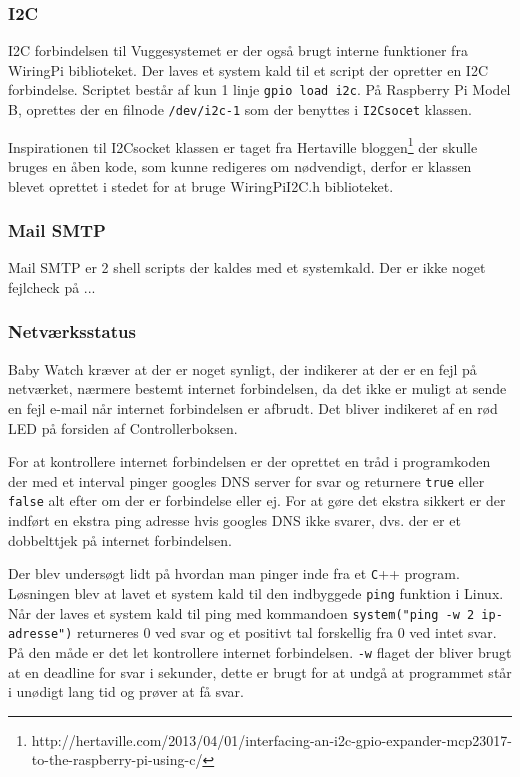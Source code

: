 \subsubsection*{I2C}

I2C forbindelsen til Vuggesystemet er der også brugt interne funktioner fra WiringPi biblioteket. Der laves et system kald til et script der opretter en I2C forbindelse. Scriptet består af kun 1 linje \verb+gpio load i2c+. På Raspberry Pi Model B, oprettes der en filnode \verb+/dev/i2c-1+ som der benyttes i \verb+I2Csocet+ klassen.

Inspirationen til I2Csocket klassen er taget fra Hertaville bloggen\footnote{http://hertaville.com/2013/04/01/interfacing-an-i2c-gpio-expander-mcp23017-to-the-raspberry-pi-using-c/} der skulle bruges en åben kode, som kunne redigeres om nødvendigt, derfor er klassen blevet oprettet i stedet for at bruge WiringPiI2C.h biblioteket.

\subsubsection*{Mail SMTP}

Mail SMTP er 2 shell scripts der kaldes med et systemkald. Der er ikke noget fejlcheck på ...

\subsubsection*{Netværksstatus}

Baby Watch kræver at der er noget synligt, der indikerer at der er en fejl på netværket, nærmere bestemt internet forbindelsen, da det ikke er muligt at sende en fejl e-mail når internet forbindelsen er afbrudt. Det bliver indikeret af en rød LED på forsiden af Controllerboksen.

For at kontrollere internet forbindelsen er der oprettet en tråd i programkoden der med et interval pinger googles DNS server for svar og returnere \verb+true+ eller \verb+false+ alt efter om der er forbindelse eller ej. For at gøre det ekstra sikkert er der indført en ekstra ping adresse hvis googles DNS ikke svarer, dvs. der er et dobbelttjek på internet forbindelsen.

Der blev undersøgt lidt på hvordan man pinger inde fra et \verb+C+++ program. Løsningen blev at lavet et system kald til den indbyggede \verb+ping+ funktion i Linux. Når der laves et system kald til ping med kommandoen \verb+system("ping -w 2 ip-adresse")+ returneres 0 ved svar og et positivt tal forskellig fra 0 ved intet svar. På den måde er det let kontrollere internet forbindelsen. \verb+-w+ flaget der bliver brugt at en deadline for svar i sekunder, dette er brugt for at undgå at programmet står i unødigt lang tid og prøver at få svar.

